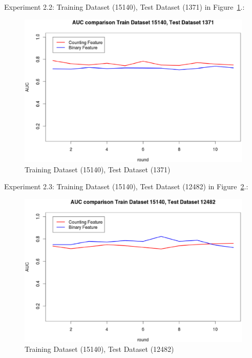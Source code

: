 \documentclass{sig-alternate}
\begin{document}
Experiment 2.2: Training Dataset  (15140), Test Dataset  (1371) in Figure~\ref{fig:fig4}.:
\begin{figure}[t]
\centering
\includegraphics[width=\columnwidth]{15140_1371.eps}
\caption{Training Dataset  (15140), Test Dataset  (1371)}
\label{fig:fig4}
\end{figure}

Experiment 2.3: Training Dataset  (15140), Test Dataset  (12482) in Figure~\ref{fig:fig5}.:
\begin{figure}[h]
\centering
\includegraphics[width=\columnwidth]{15140_12482.eps}
\caption{Training Dataset  (15140), Test Dataset  (12482) }
\label{fig:fig5}
\end{figure}
\end{document}
